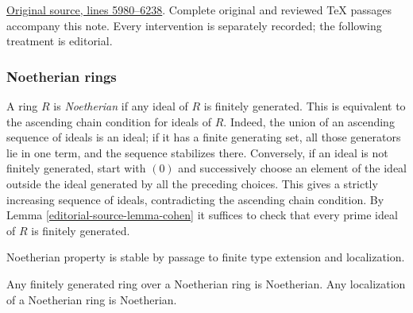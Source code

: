 \hypertarget{algebra-context-044}{}

\noindent\href{https://github.com/stacks/stacks-project/blob/a04446e57ec1fbc252a871afcec7752fb2807b14/algebra.tex\#L5980}{Original source, lines 5980--6238}. Complete original and reviewed TeX passages accompany this note. Every intervention is separately recorded; the following treatment is editorial.


\subsubsection{Noetherian rings}
\label{editorial-source-section-Noetherian}

\noindent
A ring $R$ is {\it Noetherian} if any ideal of $R$ is finitely generated.
This is equivalent to the ascending chain condition for ideals of $R$.
Indeed, the union of an ascending sequence of ideals is an ideal; if
it has a finite generating set, all those generators lie in one term,
and the sequence stabilizes there. Conversely, if an ideal is not
finitely generated, start with $(0)$ and successively choose an element
of the ideal outside the ideal generated by all the preceding choices.
This gives a strictly increasing sequence of ideals, contradicting
the ascending chain condition.
By
Lemma \ref{editorial-source-lemma-cohen}
it suffices to check that every prime ideal of $R$ is finitely generated.

\begin{lemma}
\label{editorial-source-lemma-Noetherian-permanence}
\begin{slogan}
Noetherian property is stable by passage to finite type extension
and localization.
\end{slogan}
Any finitely generated ring over a Noetherian ring
is Noetherian. Any localization of a Noetherian ring
is Noetherian.
\end{lemma}

